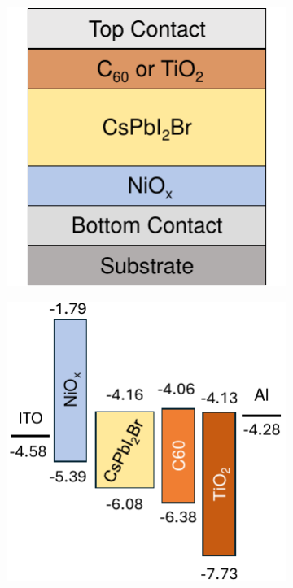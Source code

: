 \begin{figure}[htbp]
    \centering
    \begin{subfigure}[t]{0.35\textwidth} %
        \centering
        \includegraphics[width=\textwidth]{chapters/material_properties/images/stack_cross_section.pdf} %
        \caption{}
        \label{}
    \end{subfigure}
    \hspace{1cm}
    \begin{subfigure}[t]{0.45\textwidth} %
        \centering
        \includegraphics[width=\textwidth]{chapters/material_properties/images/energy_landscape.pdf} %
        \caption{}
        \label{}
    \end{subfigure}


\end{figure}
